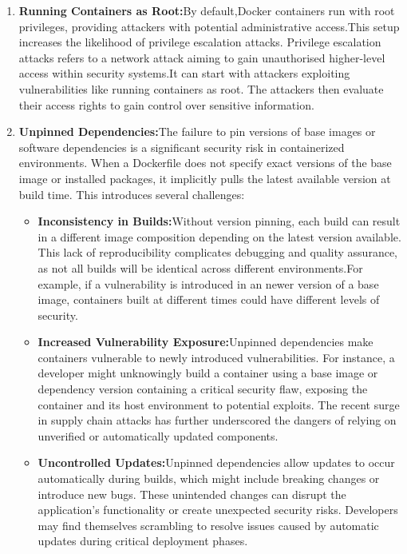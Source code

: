 \begin{enumerate}
    \item \textbf{Running Containers as Root:}By default,Docker containers run with root privileges, providing attackers with potential administrative access.This setup increases the likelihood of privilege escalation attacks. Privilege escalation attacks refers to a network attack aiming to gain unauthorised higher-level access within security systems.It can start with attackers exploiting vulnerabilities like running containers as root. The attackers then evaluate their access rights to gain control over sensitive information. \cite{Dockeranalysis}

    \item \textbf{Unpinned Dependencies:}The failure to pin versions of base images or software dependencies is a significant security risk in containerized environments. When a Dockerfile does not specify exact versions of the base image or installed packages, it implicitly pulls the latest available version at build time. This introduces several challenges:
    \begin{itemize}
        \item \textbf{Inconsistency in Builds:}Without version pinning, each build can result in a different image composition depending on the latest version available. This lack of reproducibility complicates debugging and quality assurance, as not all builds will be identical across different environments.For example, if a vulnerability is introduced in an newer version of a base image, containers built at different times could have different levels of security. 
        \item \textbf{Increased Vulnerability Exposure:}Unpinned dependencies make containers vulnerable to newly introduced vulnerabilities. For instance, a developer might unknowingly build a container using a base image or dependency version containing a critical security flaw, exposing the container and its host environment to potential exploits. The recent surge in supply chain attacks has further underscored the dangers of relying on unverified or automatically updated components.
        \item \textbf{Uncontrolled Updates:}Unpinned dependencies allow updates to occur automatically during builds, which might include breaking changes or introduce new bugs. These unintended changes can disrupt the application’s functionality or create unexpected security risks. Developers may find themselves scrambling to resolve issues caused by automatic updates during critical deployment phases.

\end{itemize}
\end{enumerate}
